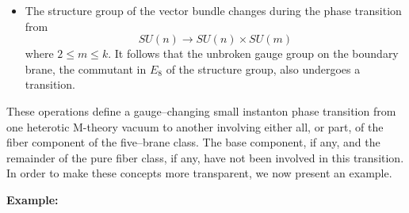 \documentclass[a4paper,12pt]{article}
\numberwithin{equation}{section}
\theoremstyle{plain}
\begin{document}
\begin{itemize}
\item The structure group of the vector bundle changes during the phase
transition from
\begin{equation}
SU(n) \longrightarrow SU(n) \times SU(m)
\label{eq:192}
\end{equation}
where $2 \leq m \leq k$. It follows that the unbroken gauge group on the
boundary brane, the commutant in $E_{8}$ of the structure group,  
also undergoes a transition.

\end{itemize}

These operations define a gauge--changing small instanton phase transition
from one heterotic M-theory vacuum to another involving either all, or part, of
the fiber component of the five--brane class. The base
component, if any, and the remainder of the pure fiber class, if any, 
have not been involved in this transition. In order to make these 
concepts more transparent, we now
present an example.

\bigskip

\noindent
{\bf Example:}
\end{document}
